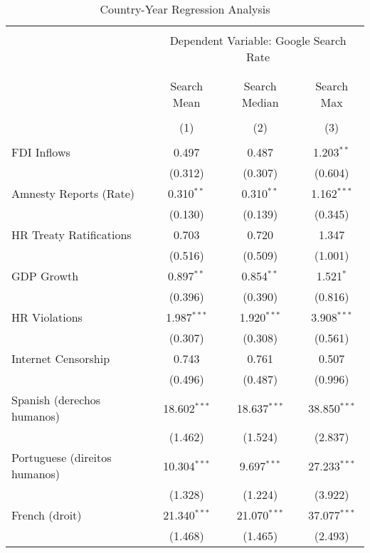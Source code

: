 
\begin{table}[!htbp] \centering 
  \caption{Country-Year Regression Analysis} 
  \label{} 
\begin{tabular}{@{\extracolsep{5pt}}lccc} 
\\[-1.8ex]\hline 
\hline \\[-1.8ex] 
 & \multicolumn{3}{c}{Dependent Variable: Google Search Rate} \\ 
\cline{2-4} 
\\[-1.8ex] & \multicolumn{3}{c}{ } \\ 
 & Search Mean & Search Median & Search Max \\ 
\\[-1.8ex] & (1) & (2) & (3)\\ 
\hline \\[-1.8ex] 
 FDI Inflows & 0.497 & 0.487 & 1.203$^{**}$ \\ 
  & (0.312) & (0.307) & (0.604) \\ 
  Amnesty Reports (Rate) & 0.310$^{**}$ & 0.310$^{**}$ & 1.162$^{***}$ \\ 
  & (0.130) & (0.139) & (0.345) \\ 
  HR Treaty Ratifications & 0.703 & 0.720 & 1.347 \\ 
  & (0.516) & (0.509) & (1.001) \\ 
  GDP Growth & 0.897$^{**}$ & 0.854$^{**}$ & 1.521$^{*}$ \\ 
  & (0.396) & (0.390) & (0.816) \\ 
  HR Violations & 1.987$^{***}$ & 1.920$^{***}$ & 3.908$^{***}$ \\ 
  & (0.307) & (0.308) & (0.561) \\ 
  Internet Censorship & 0.743 & 0.761 & 0.507 \\ 
  & (0.496) & (0.487) & (0.996) \\ 
  Spanish (derechos humanos) & 18.602$^{***}$ & 18.637$^{***}$ & 38.850$^{***}$ \\ 
  & (1.462) & (1.524) & (2.837) \\ 
  Portuguese (direitos humanos) & 10.304$^{***}$ & 9.697$^{***}$ & 27.233$^{***}$ \\ 
  & (1.328) & (1.224) & (3.922) \\ 
  French (droit) & 21.340$^{***}$ & 21.070$^{***}$ & 37.077$^{***}$ \\ 
  & (1.468) & (1.465) & (2.493) \\ 

\end{tabular}
\end{table}
